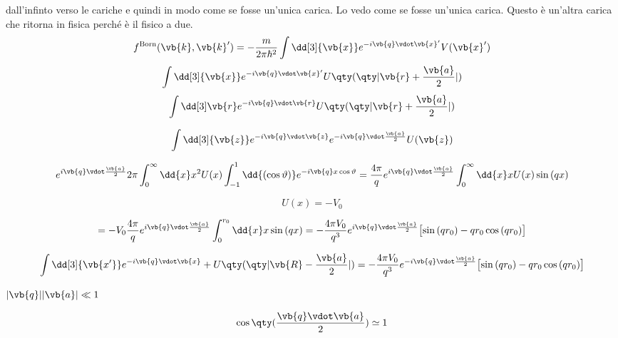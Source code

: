 {\begin{soluzione}
dall'infinto verso le cariche e quindi in modo come se fosse un'unica carica. Lo vedo come se fosse un'unica carica. Questo è un'altra carica che ritorna in fisica perché è il fisico a due.
   \begin{equation*}
      f^{\rm Born}(\vb{k},\vb{k}')
      =-\frac{m}{2\pi\hbar^2} \int \dd[3]{\vb{x}} e^{-i \vb{q} \vdot \vb{x}'} V(\vb{x}')
   \end{equation*}
   \begin{equation*}
      \int \dd[3]{\vb{x}} e^{-i \vb{q} \vdot \vb{x}'} U\qty( \qty| \vb{r} + \frac{\vb{a}}{2} | )
   \end{equation*}
   \begin{equation*}
      \int \dd[3]\vb{r} e^{-i \vb{q} \vdot \vb{r}} U\qty( \qty| \vb{r} + \frac{\vb{a}}{2} | )
   \end{equation*}

   \begin{equation*}
      \int \dd[3]{\vb{z}} e^{-i \vb{q} \vdot \vb{z}} e^{-i \vb{q} \vdot \frac{\vb{a}}{2}} U(\vb{z})
   \end{equation*}

   \begin{equation*}
      e^{i \vb{q} \vdot \frac{\vb{a}}{2}} 2\pi \int_{0}^{\infty} \dd{x} x^2 U(x) \int_{-1}^{1} \dd{(\cos{\vartheta})} e^{-i \vb{q} x \cos{\vartheta}}
      =\frac{4\pi}{q} e^{ i \vb{q} \vdot \frac{\vb{a}}{2} } \int_{0}^{\infty} \dd{x} x U(x) \sin{(qx)}
   \end{equation*}

   \begin{equation*}
      U(x)=-V_0
   \end{equation*}

   \begin{equation*}
      =-V_0 \frac{4\pi}{q} e^{i \vb{q} \vdot \frac{\vb{a}}{2} } \int_{0}^{r_0} \dd{x} x \sin{(qx)}
      =-\frac{4\pi V_0}{q^3} e^{ i \vb{q} \vdot \frac{\vb{a}}{2} } \bigl[ \sin{(qr_0)} - qr_0\cos{(qr_0)} \bigr]
   \end{equation*}

   \begin{equation*}
      \int \dd[3]{\vb{x'}} e^{-i \vb{q} \vdot \vb{x}} + U\qty( \qty| \vb{R} - \frac{\vb{a}}{2} | )
      =-\frac{4 \pi V_0}{q^3} e^{ -i \vb{q} \vdot \frac{\vb{a}}{2} } \bigl[ \sin{(qr_0)} - qr_0\cos{(qr_0)} \bigr]
   \end{equation*}

   $|\vb{q}||\vb{a}| \ll 1$

   \begin{equation*}
      \cos{ \qty( \frac{\vb{q} \vdot \vb{a}}{2} ) } \simeq 1
   \end{equation*}


\end{soluzione}}
